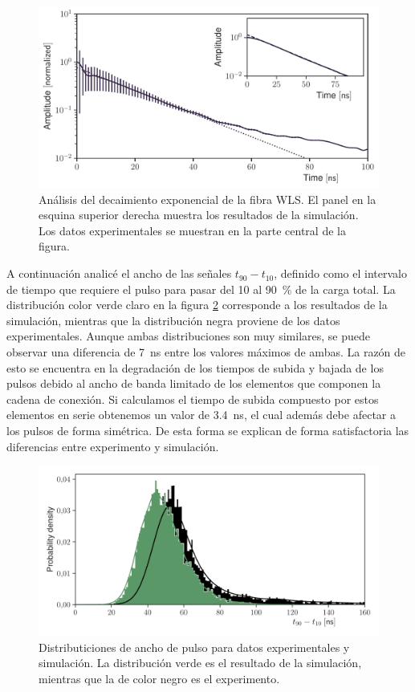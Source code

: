 \begin{figure}
        \centering
        \includegraphics[width=\textwidth]{muons-tail-fit.pdf}
        \caption{Análisis del decaimiento exponencial de la fibra WLS. El panel en la esquina superior derecha muestra los resultados de la simulación. Los datos experimentales se muestran en la parte central de la figura.}
        \label{fig:muons-tail}
\end{figure}

A continuación analicé el ancho de las señales $t_{90}-t_{10}$, definido como el intervalo de tiempo que requiere el pulso para pasar del \num{10} al \SI{90}{\percent} de la carga total. La distribución color verde claro en la figura \ref{fig:t90-distribution} corresponde a los resultados de la simulación, mientras que la distribución negra proviene de los datos experimentales. Aunque ambas distribuciones son muy similares, se puede observar una diferencia de \SI{7}{\ns} entre los valores máximos de ambas. La razón de esto se encuentra en la degradación de los tiempos de subida y bajada de los pulsos debido al ancho de banda limitado de los elementos que componen la cadena de conexión. Si calculamos el tiempo de subida compuesto por estos elementos en serie obtenemos un valor de \SI{3.4}{\ns}, el cual además debe afectar a los pulsos de forma simétrica. De esta forma se explican de forma satisfactoria las diferencias entre experimento y simulación.

\begin{figure}
        \centering
        \includegraphics[width=\textwidth]{t90_dist.pdf}
        \caption{Distributiciones de ancho de pulso para datos experimentales y simulación. La distribución verde es el resultado de la simulación, mientras que la de color negro es el experimento.}
        \label{fig:t90-distribution}
\end{figure}

